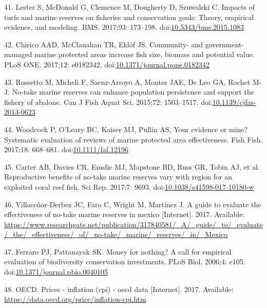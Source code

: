 \documentclass[12pt,]{article}
\begin{document}
\hypertarget{ref-lester_2017-nh}{}
41. Lester S, McDonald G, Clemence M, Dougherty D, Szuwalski C. Impacts
of turfs and marine reserves on fisheries and conservation goals:
Theory, empirical evidence, and modeling. BMS. 2017;93: 173--198.
doi:\href{https://doi.org/10.5343/bms.2015.1083}{10.5343/bms.2015.1083}

\hypertarget{ref-chirico_2017-Rz}{}
42. Chirico AAD, McClanahan TR, Eklöf JS. Community- and
government-managed marine protected areas increase fish size, biomass
and potential value. PLoS ONE. 2017;12: e0182342.
doi:\href{https://doi.org/10.1371/journal.pone.0182342}{10.1371/journal.pone.0182342}

\hypertarget{ref-rossetto_2015-V0}{}
43. Rossetto M, Micheli F, Saenz-Arroyo A, Montes JAE, De Leo GA, Rochet
M-J. No-take marine reserves can enhance population persistence and
support the fishery of abalone. Can J Fish Aquat Sci. 2015;72:
1503--1517.
doi:\href{https://doi.org/10.1139/cjfas-2013-0623}{10.1139/cjfas-2013-0623}

\hypertarget{ref-woodcock_2017-Wm}{}
44. Woodcock P, O'Leary BC, Kaiser MJ, Pullin AS. Your evidence or mine?
Systematic evaluation of reviews of marine protected area effectiveness.
Fish Fish. 2017;18: 668--681.
doi:\href{https://doi.org/10.1111/faf.12196}{10.1111/faf.12196}

\hypertarget{ref-carter_2017-Uf}{}
45. Carter AB, Davies CR, Emslie MJ, Mapstone BD, Russ GR, Tobin AJ, et
al. Reproductive benefits of no-take marine reserves vary with region
for an exploited coral reef fish. Sci Rep. 2017;7: 9693.
doi:\href{https://doi.org/10.1038/s41598-017-10180-w}{10.1038/s41598-017-10180-w}

\hypertarget{ref-villaseorderbez_website_2017-xE}{}
46. Villaseñor-Derbez JC, Faro C, Wright M, Martínez J. A guide to
evaluate the effectiveness of no-take marine reserves in mexico
{[}Internet{]}. 2017. Available:
\url{https://www.researchgate.net/publication/317840581/_A/_guide/_to/_evaluate/_the/_effectiveness/_of/_no-take/_marine/_reserves/_in/_Mexico}

\hypertarget{ref-ferraro_2006-oW}{}
47. Ferraro PJ, Pattanayak SK. Money for nothing? A call for empirical
evaluation of biodiversity conservation investments. PLoS Biol. 2006;4:
e105.
doi:\href{https://doi.org/10.1371/journal.pbio.0040105}{10.1371/journal.pbio.0040105}

\hypertarget{ref-oecd_website_2017-VV}{}
48. OECD. Prices - inflation (cpi) - oecd data {[}Internet{]}. 2017.
Available: \url{https://data.oecd.org/price/inflation-cpi.htm}
\end{document}
